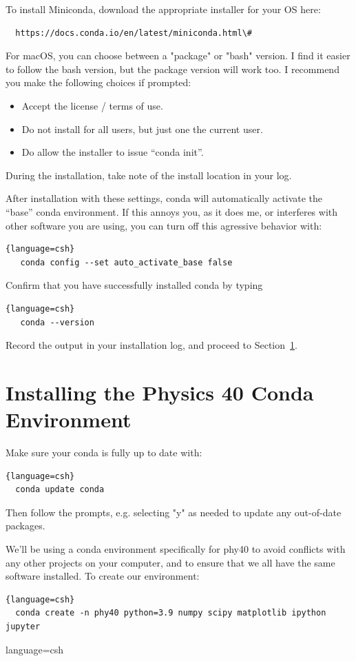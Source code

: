 To install Miniconda, download the appropriate installer for your OS
here:
\begin{verbatim}
  https://docs.conda.io/en/latest/miniconda.html\#
\end{verbatim}
For macOS, you can choose between a "package" or "bash" version. I
find it easier to follow the bash version, but the package version
will work too. I recommend you make the following choices if prompted:
\begin{itemize}
\item Accept the license / terms of use.
\item Do not install for all users, but just one the current user.
\item Do allow the installer to issue ``conda init''.
\end{itemize}
During the installation, take note of the install location in your log.

After installation with these settings, conda will automatically
activate the ``base'' conda environment.  If this annoys you, as it
does me, or interferes with other software you are using, you can turn
off this agressive behavior with:
\begin{lstlisting}{language=csh}
   conda config --set auto_activate_base false
\end{lstlisting}

Confirm that you have successfully installed conda by typing
\begin{lstlisting}{language=csh}
   conda --version
\end{lstlisting}
Record the output in your installation log, and proceed to Section~\ref{sec:env}.

\section{Installing the Physics 40 Conda Environment}
\label{sec:env}

Make sure your conda is fully up to date with:
\begin{lstlisting}{language=csh}
  conda update conda
\end{lstlisting}
Then follow the prompts, e.g. selecting "y" as needed to update any out-of-date packages.

We'll be using a conda environment specifically for phy40 to avoid
conflicts with any other projects on your computer, and to ensure that
we all have the same software installed.  To create our environment:
\begin{lstlisting}{language=csh}
  conda create -n phy40 python=3.9 numpy scipy matplotlib ipython jupyter
\end{lstlisting}{language=csh}
  
